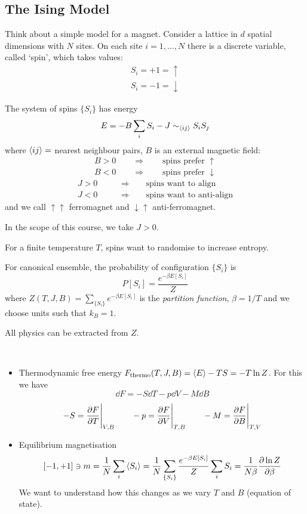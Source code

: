 \documentclass[a4paper,11pt]{article}
\begin{document}
	\subsection{The Ising Model}
	Think about a simple model for a magnet. Consider a lattice in $d$ spatial dimensions with $N$ sites. On each site $i = 1, \dots , N$ there is a discrete variable, called `spin', which takes values:
	\begin{align*}
		S_i = + 1 = \uparrow\\
		S_i = - 1 = \downarrow
	\end{align*}


	The system of spins $\{S_i\}$ has energy
	\[
		E = -B \sum_i S_i - J \sim_{\expval{ij}}S_i S_j
	\]
	where $\expval{ij} = $ nearest neighbour pairs, $B$ is an external magnetic field:
	\begin{align*}
		B>0 \qquad \Rightarrow\qquad \text{spins prefer }\uparrow\\
		B<0 \qquad \Rightarrow\qquad \text{spins prefer }\downarrow
	\end{align*}
	\begin{align*}
		J > 0 &\qquad \Rightarrow\qquad \text{spins want to align}\\
		J < 0 &\qquad \Rightarrow\qquad \text{spins want to anti-align}
	\end{align*}
	and we call $\uparrow\uparrow$ ferromagnet and $\downarrow\uparrow$ anti-ferromagnet.
	
	In the scope of this course, we take $J > 0$.

	For a finite temperature $T$, spins want to randomise to increase entropy.

	For canonical ensemble, the probability of configuration $\{S_i\}$ is 
	$$P[S_i] = \frac{e^{- \beta E[S_i]}}{Z}$$ 
	where $Z(T,J,B) = \sum_{\{S_i\}} e ^{-\beta E[S_i]}$ is the \emph{partition function}, $\beta = 1/T$ and we choose units such that $k_B = 1$.

	All physics can be extracted from $Z$.

	\begin{ex} \ 
		\begin{itemize}
			\item Thermodynamic free energy $F_{\text{thermo}}(T,J,B) = \expval{E} - TS = - T \ln Z$. For this we have 
			\[
				\dd{F} = -S \dd{T} - p \dd{V} - M \dd{B}
			\]
			\[
				-S = \pdv{F}{T}\Bigg|_{V,B} \qquad -p = \pdv{F}{V}\Bigg|_{T,B} \qquad - M = \pdv{F}{B}\Bigg|_{T,V}
			\]
			\item Equilibrium magnetisation \[
				[-1,+1] \ni m = \frac{1}{N}\sum_i \expval{S_i} = \frac{1}{N}\sum_{\{S_i\}} \frac{e^{-\beta E[S_i]}}{Z} \sum_i S_i = \frac{1}{N\beta} \pdv{\ln Z}{\beta}
			\]
			We want to understand how this changes as we vary $T$ and $B$ (equation of state).
		\end{itemize}
	\end{ex}
\end{document}
